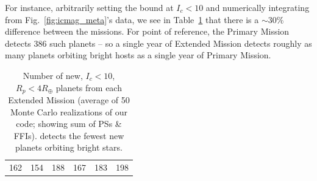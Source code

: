 For instance, arbitrarily setting the bound at $I_c<10$ and numerically 
integrating from Fig.~\ref{fig:icmag_meta}'s data, we see in 
Table~\ref{tab:icmag_meta} that there is a $\sim30\%$ difference between the 
missions.
For point of reference, the Primary Mission detects 386 such planets -- so a single year of Extended Mission detects roughly as many planets orbiting bright hosts as a single year of Primary Mission.
\begin{table}[!ht]
	\centering
	\caption{Number of new, $I_c<10$, $R_p<4R_\oplus$ planets from each Extended Mission (average of 50 Monte Carlo realizations of our code; showing sum of PSs \& FFIs). \npole\:detects the fewest new planets orbiting bright stars.}
	\label{tab:icmag_meta}
	\begin{tabular}{|c|c|c|c|c|c|}
		\hline
		\nhemi & \npole & \shemiAvoid & \elong & \eshort & \hemis \\ \hline
		162    & 154    & 188         & 167    & 183     & 198    \\ \hline
	\end{tabular}
\end{table}

